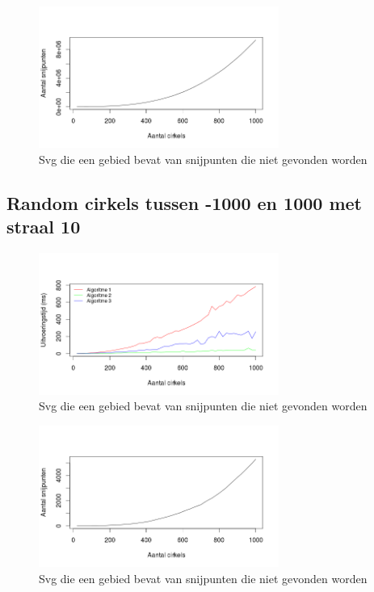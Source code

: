 \documentclass[11pt,a4paper]{article}
\begin{document}
\begin{figure}[H]
\centering
\includegraphics[width=0.7\textwidth]{snijpunten_10.png}
\caption*{Svg die een gebied bevat van snijpunten die niet gevonden worden}
\end{figure}

\subsection{Random cirkels tussen -1000 en 1000 met straal 10}
\begin{figure}[H]
\centering
\includegraphics[width=0.7\textwidth]{uitvoeringstijd_100.png}
\caption*{Svg die een gebied bevat van snijpunten die niet gevonden worden}
\end{figure}

\begin{figure}[H]
\centering
\includegraphics[width=0.7\textwidth]{snijpunten_100.png}
\caption*{Svg die een gebied bevat van snijpunten die niet gevonden worden}
\end{figure}
\end{document}
